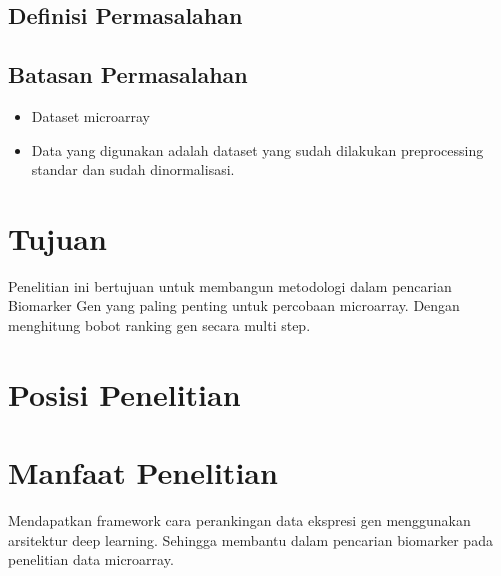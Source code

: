 \subsection{Definisi Permasalahan}


\subsection{Batasan Permasalahan}
\begin{itemize}
\item Dataset microarray
\item Data yang digunakan adalah dataset yang sudah dilakukan preprocessing standar dan sudah dinormalisasi.
\end{itemize}

\section{Tujuan}
Penelitian ini bertujuan untuk membangun metodologi dalam pencarian Biomarker Gen yang paling penting untuk percobaan microarray. Dengan menghitung bobot ranking gen secara multi step.

\section{Posisi Penelitian}




\section{Manfaat Penelitian}
Mendapatkan framework cara perankingan data ekspresi gen menggunakan arsitektur deep learning. Sehingga membantu dalam pencarian biomarker pada penelitian data microarray.

